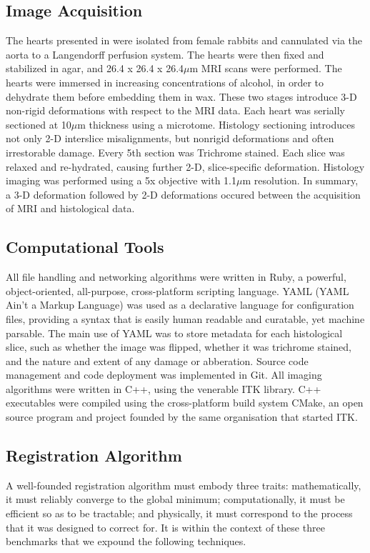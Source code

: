   \subsection{Image Acquisition} %
  \label{sec:image_acquisition}
    The hearts presented in \cite{Burton:2006p100} were isolated from female rabbits and cannulated via the aorta to a Langendorff perfusion system. The hearts were then fixed and stabilized in agar, and 26.4 x 26.4 x 26.4$\mu$m MRI scans were performed. The hearts were immersed in increasing concentrations of alcohol, in order to dehydrate them before embedding them in wax. These two stages introduce 3-D non-rigid deformations with respect to the MRI data. Each heart was serially sectioned at 10$\mu$m thickness using a microtome. Histology sectioning introduces not only 2-D interslice misalignments, but nonrigid deformations and often irrestorable damage. Every 5th section was Trichrome stained. Each slice was relaxed and re-hydrated, causing further 2-D, slice-specific deformation. Histology imaging was performed using a 5x objective with 1.1$\mu$m resolution. In summary, a 3-D deformation followed by 2-D deformations occured between the acquisition of MRI and histological data.
    
  \subsection{Computational Tools} %
  \label{sec:computational_tools}
    All file handling and networking algorithms were written in Ruby, a powerful, object-oriented, all-purpose, cross-platform scripting language. YAML (YAML Ain't a Markup Language) was used as a declarative language for configuration files, providing a syntax that is easily human readable and curatable, yet machine parsable. The main use of YAML was to store metadata for each histological slice, such as whether the image was flipped, whether it was trichrome stained, and the nature and extent of any damage or abberation. Source code management and code deployment was implemented in Git. All imaging algorithms were written in C++, using the venerable ITK library. C++ executables were compiled using the cross-platform build system CMake, an open source program and project founded by the same organisation that started ITK.
    
  \subsection{Registration Algorithm} %
  \label{sec:registration_algorithm}
    A well-founded registration algorithm must embody three traits: mathematically, it must reliably converge to the global minimum; computationally, it must be efficient so as to be tractable; and physically, it must correspond to the process that it was designed to correct for. It is within the context of these three benchmarks that we expound the following techniques.
    
